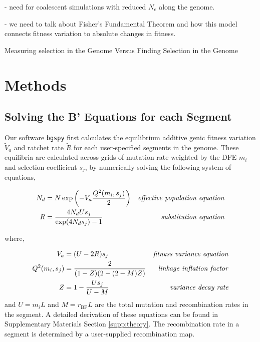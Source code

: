 \documentclass[11pt]{article}
\begin{document}
- need for coalescent simulations with reduced $N_e$ along the genome.

- we need to talk about Fisher's Fundamental Theorem and how this model
connects fitness variation to absolute changes in fitness.

Measuring selection in the Genome Versus Finding Selection in the Genome


\section*{Methods}

\subsection*{Solving the B' Equations for each Segment}
\label{sec:methods-bprime-eqns}

Our software \texttt{bgspy} first calculates the equilibrium additive genic
fitness variation $\widetilde{V}_a$ and ratchet rate $\widetilde{R}$ for each
user-specified segments in the genome. These equilibria are calculated across
grids of mutation rate weighted by the DFE $m_i$ and selection coefficient
$s_j$, by numerically solving the following system of equations,

\begin{align}
  \label{eq:}
  {N}_{d} &= N \exp \left( -V_a \frac{Q^2(m_i, s_j)}{2} \right) & \text{\emph{effective population equation}} \\
  R &= \frac{4N_dU s_j}{\exp(4 N_d s_j)-1}  & \text{\emph{substitution equation}} 
\end{align}

where,

\begin{align}
  V_a &= (U - 2 R) s_j & \text{\emph{fitness variance equation}} \\
  Q^2(m_i, s_j) &= \frac{2}{(1-Z)(2-(2-M)Z)} & \text{\emph{linkage inflation factor}} \\
  Z &= 1 - \frac{Us_j}{U-{M}} & \text{\emph{variance decay rate}}
\end{align}
%
and $U = m_i L$ and $M = r_\text{BP} L$ are the total mutation and
recombination rates in the segment. A detailed derivation of these equations
can be found in Supplementary Materials Section \ref{supp:theory}. The recombination
rate in a segment is determined by a user-supplied recombination map.
\end{document}

